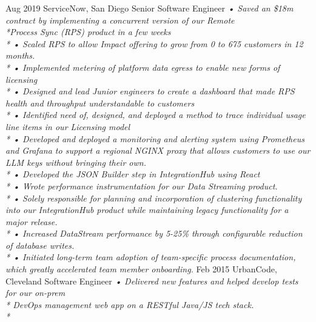 \documentclass[]{friggeri-cv}
\begin{document}
\begin{entrylist}
  \entry
    {Aug 2019}
    {ServiceNow, San Diego}
    {Senior Software Engineer}
    {\emph{
    •	Saved an \$18m contract by implementing a concurrent version of our Remote \\*Process Sync (RPS) product in a few weeks\\*
    •	Scaled RPS to allow Impact offering to grow from 0 to 675 customers in 12 months.\\*
    •	Implemented metering of platform data egress to enable new forms of licensing\\*
    •	Designed and lead Junior engineers to create a dashboard that made RPS health and throughput understandable to customers\\*
    •	Identified need of, designed, and deployed a method to trace individual usage line items in our Licensing model\\*
    •	Developed and deployed a monitoring and alerting system using Prometheus and Grafana to support a regional NGINX proxy that allows customers to use our LLM keys without bringing their own.\\*
    •	Developed the JSON Builder step in IntegrationHub using React\\*
    •	Wrote performance instrumentation for our Data Streaming product.\\*
    •	Solely responsible for planning and incorporation of clustering functionality into our IntegrationHub product while maintaining legacy functionality for a major release.\\*
    •	Increased DataStream performance by 5-25\% through configurable reduction of database writes.\\*
    •	Initiated long-term team adoption of team-specific process documentation, which greatly accelerated team member onboarding.}}
  \entry
    {Feb 2015}
    {UrbanCode, Cleveland}
    {Software Engineer}
    {\emph{
    •	Delivered new features and helped develop tests for our on-prem \\* DevOps management web app on a RESTful Java/JS tech stack.\\*
}}
\end{entrylist}
\end{document}
